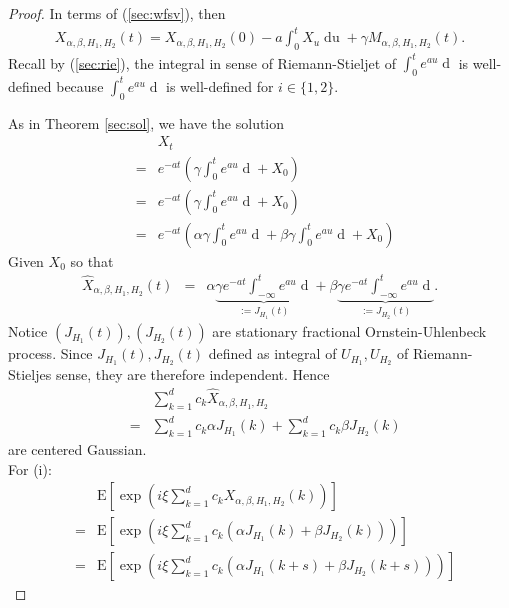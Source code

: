 \documentclass[a4paper, twoside, 11pt]{article}
\theoremstyle{definition}
\newcommand{\brkt}[1]{\left({#1} \right)}
\begin{document}
\begin{proof}
  In terms of (\ref{sec:wfsv}), then
  \begin{eqnarray*}
	X_{\alpha,\beta,H_1,H_2}(t) = X_{\alpha,\beta,H_1,H_2}(0) - a\int_0^t X_u \mathop{du} + \gamma M_{\alpha,\beta,H_1,H_2}(t).
\end{eqnarray*}
Recall by (\ref{sec:rie}), the integral in sense of Riemann-Stieljet of $\int_0^t e^{au} \mathop{dM_{\alpha,\beta,H_1,H_2}}$ is well-defined because $\int_0^t e^{au} \mathop{dU_{H_i}}$ is well-defined for $i\in\{1,2\}$.

As in Theorem \ref{sec:sol}, we have the solution
\begin{eqnarray*}
  &&X_t\\ 
  &=& e^{-at} \brkt{\gamma\int_0^t e^{au} \mathop{dM_{\alpha,\beta,H_1,H_2}} + X_0}\\
  &=&  e^{-at} \brkt{\gamma\int_0^t e^{au} \mathop{d(\alpha U_{H_1} + \beta U_{H_2})} + X_0}\\
  &=&  e^{-at} \brkt{\alpha \gamma\int_0^t e^{au} \mathop{d U_{H_1}} + \beta \gamma\int_0^t e^{au} \mathop{d U_{H_2}} + X_0}
\end{eqnarray*}
Given $X_0$ so that
\begin{eqnarray}
  \hat{X}_{\alpha,\beta,H_1,H_2}(t) &=&  \alpha \underbrace{\gamma e^{-at}\int_{-\infty}^t e^{au} \mathop{d U_{H_1}}}_{:=J_{H_1}(t)} + \beta\underbrace{ \gamma e^{-at}\int_{-\infty}^t e^{au} \mathop{d U_{H_2}}}_{:=J_{H_2}(t)}.
  \label{sec:jjj}
\end{eqnarray}
Notice $(J_{H_1}(t)), (J_{H_2}(t))$ are stationary fractional Ornstein-Uhlenbeck process. Since $J_{H_1}(t), J_{H_2}(t)$ defined as integral of $U_{H_1}, U_{H_2}$ of Riemann-Stieljes sense, they are therefore independent.  Hence 
\begin{eqnarray*}
  && \sum\limits_{k=1}^{d} c_k \hat{X}_{\alpha,\beta,H_1,H_2}\\
  &=& \sum\limits_{k=1}^{d} c_k \alpha J_{H_1}(k) + \sum\limits_{k=1}^{d} c_k \beta J_{H_2}(k)
\end{eqnarray*}
are centered Gaussian.\\
For (i): 
 \begin{eqnarray*}
   &&\mathrm{E}[\exp(i\xi\sum\limits_{k=1}^{d} c_k X_{\alpha,\beta,H_1,H_2}(k))]\\
   &=& \mathrm{E}[\exp(i\xi\sum\limits_{k=1}^{d} c_k (\alpha J_{H_1}(k) + \beta J_{H_2}(k)))]\\
   &=& \mathrm{E}[\exp(i\xi\sum\limits_{k=1}^{d} c_k (\alpha J_{H_1}(k+s) + \beta J_{H_2}(k+s)))]

\end{eqnarray*}
\end{proof}
\end{document}

